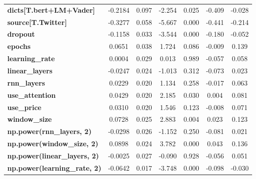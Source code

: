 \begin{center}
\begin{tabular}{lcccccc}
\textbf{dicts[T.bert+LM+Vader]}      &      -0.2184  &        0.097     &    -2.254  &         0.025        &       -0.409    &       -0.028     \\
\textbf{source[T.Twitter]}           &      -0.3277  &        0.058     &    -5.667  &         0.000        &       -0.441    &       -0.214     \\
\textbf{dropout}                     &      -0.1158  &        0.033     &    -3.544  &         0.000        &       -0.180    &       -0.052     \\
\textbf{epochs}                      &       0.0651  &        0.038     &     1.724  &         0.086        &       -0.009    &        0.139     \\
\textbf{learning\_rate}              &       0.0004  &        0.029     &     0.013  &         0.989        &       -0.057    &        0.058     \\
\textbf{linear\_layers}              &      -0.0247  &        0.024     &    -1.013  &         0.312        &       -0.073    &        0.023     \\
\textbf{rnn\_layers}                 &       0.0229  &        0.020     &     1.134  &         0.258        &       -0.017    &        0.063     \\
\textbf{use\_attention}              &       0.0429  &        0.020     &     2.185  &         0.030        &        0.004    &        0.081     \\
\textbf{use\_price}                  &       0.0310  &        0.020     &     1.546  &         0.123        &       -0.008    &        0.071     \\
\textbf{window\_size}                &       0.0728  &        0.025     &     2.883  &         0.004        &        0.023    &        0.123     \\
\textbf{np.power(rnn\_layers, 2)}    &      -0.0298  &        0.026     &    -1.152  &         0.250        &       -0.081    &        0.021     \\
\textbf{np.power(window\_size, 2)}   &       0.0898  &        0.024     &     3.782  &         0.000        &        0.043    &        0.136     \\
\textbf{np.power(linear\_layers, 2)} &      -0.0025  &        0.027     &    -0.090  &         0.928        &       -0.056    &        0.051     \\
\textbf{np.power(learning\_rate, 2)} &      -0.0642  &        0.017     &    -3.748  &         0.000        &       -0.098    &       -0.030     \\

\end{tabular}
\end{center}
